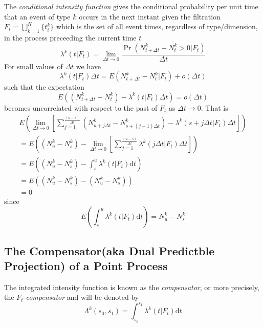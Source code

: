 \documentclass{article}
\newcommand{\mathd}{\mathrm{d}}
\newcommand{\tmem}[1]{{\em #1\/}}
\begin{document}
The {\tmem{conditional intensity function}} gives the conditional probability
per unit time that an event of type $k$ occurs in the next instant given the
filtration $F_t = \bigcup_{k = 1}^K \{ t^k_i \}$ which is the set of all event
times, regardless of type/dimension, in the process preceeding the current
time $t$
\begin{equation}
  \lambda^k ( t | F^{}_t) = \lim_{\Delta t \rightarrow 0} \frac{\Pr ( N^k_{t +
  \Delta t} - N^k_t > 0 | F_t)}{\Delta t}
\end{equation}
For small values of $\Delta t$ we have
\begin{equation}
  \lambda^k ( t | F^{}_t) \Delta t = E ( N_{t + \Delta t}^k - N^k_t | F_t) + o
  ( \Delta t)
\end{equation}
such that the expectation
\begin{equation}
  E ( ( N^k_{t + \Delta t} - N^k_t) - \lambda^k ( t | F_t) \Delta t) = o (
  \Delta t)  \label{E}
\end{equation}
becomes uncorrelated with respect to the past of $F_t$ as $\Delta t
\rightarrow 0$. That is
\begin{equation}
  \begin{array}{l}
    E \left( \lim_{\Delta t \rightarrow 0} \left[ \sum_{j = 1}^{\frac{( u -
    s_{})}{\Delta t}} ( N^k_{u + j \Delta t} - N_{s + ( j - 1) \Delta t}^k) -
    \lambda^k ( s + j \Delta t | F_t) \Delta t \right] \right)\\
    = E \left( ( N_u^k - N^k_{s_{}}) - \lim_{\Delta t \rightarrow 0} \left[
    \sum_{j = 1}^{\frac{ ( u - s)}{\Delta t}} \lambda^k ( j \Delta t | F_t)
    \Delta t \right] \right)\\
    = E \left( ( N^k_u - N^k_{s_{}}) - \int_{s_{}}^u \lambda^k ( t | F_t)
    \mathd t \right)\\
    = E ( ( N^k_u - N^k_{s_{}}) - ( N^k_u - N^k_{s_{}}))\\
    = 0
  \end{array}
\end{equation}
since
\begin{equation}
  E \left( \int_s^u \lambda^k ( t | F_t) \mathd t \right) = N^k_u - N^k_s
\end{equation}

\subsection{The Compensator(aka Dual Predictble Projection) of a Point
Process}

The integrated intensity function is known as the {\tmem{compensator}}, or
more precisely, the {\tmem{$F_t$-compensator}} and will be denoted by
\begin{equation}
  \Lambda^k ( s_0, s_1) = \int_{s_0}^{s_1} \lambda^k ( t | F_t) \mathd t
  \label{compensator}
\end{equation}
\end{document}
